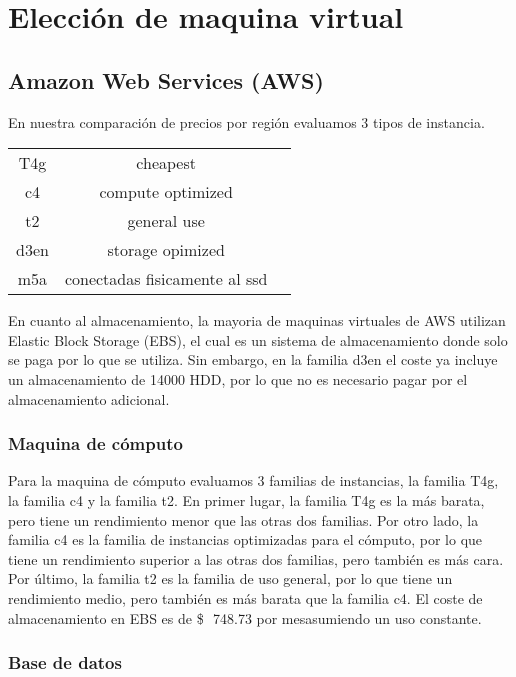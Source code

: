 \documentclass{article}
\newcommand{\usd}[1]{\SI{#1}[\$\ensuremath{\,}]{}}
\begin{document}
\section{Elección de maquina virtual}
  \subsection{Amazon Web Services (AWS)}

    En nuestra comparación de precios por región evaluamos 3 tipos de instancia.
      \begin{table}[!htp]\centering
        \begin{tabular}{|c|c|c|}
          T4g	& cheapest          \\
          c4	& compute optimized \\
          t2	& general use       \\
          d3en & storage opimized \\
          m5a	& conectadas fisicamente al ssd \\
        \end{tabular}
      \end{table}

      En cuanto al almacenamiento, la mayoria de maquinas virtuales de AWS utilizan Elastic Block Storage (EBS), el cual es un sistema de almacenamiento donde solo se paga por lo que se utiliza. Sin embargo, en la familia d3en el coste ya incluye un almacenamiento de 14000 HDD, por lo que no es necesario pagar por el almacenamiento adicional.

      \subsubsection*{Maquina de cómputo}

      Para la maquina de cómputo evaluamos 3 familias de instancias, la familia T4g, la familia c4 y la familia t2. En primer lugar, la familia T4g es la más barata, pero tiene un rendimiento menor que las otras dos familias. Por otro lado, la familia c4 es la familia de instancias optimizadas para el cómputo, por lo que tiene un rendimiento superior a las otras dos familias, pero también es más cara. Por último, la familia t2 es la familia de uso general, por lo que tiene un rendimiento medio, pero también es más barata que la familia c4.
      El coste de almacenamiento en EBS es de \usd{748.73}  por mesasumiendo un uso constante.
      \subsubsection*{Base de datos}
\end{document}
